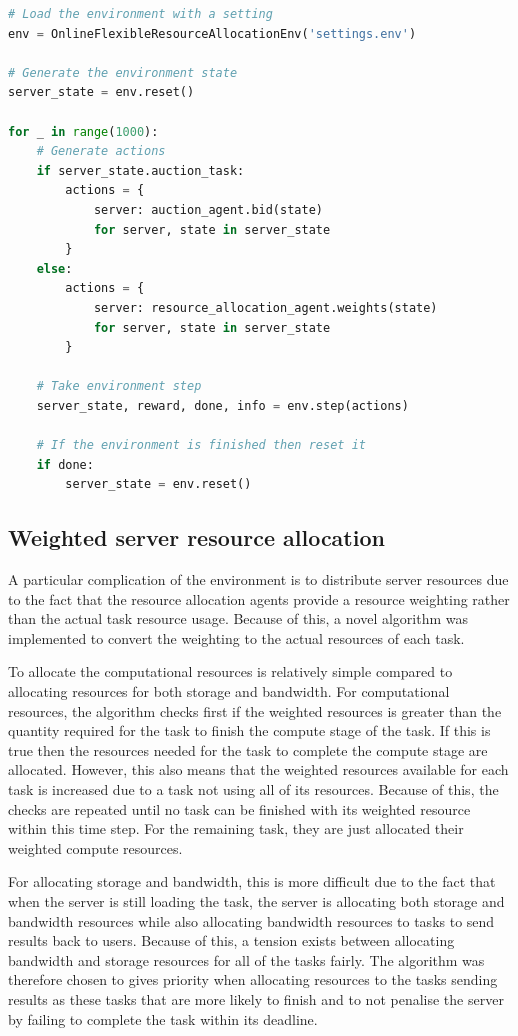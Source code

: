 \begin{lstlisting}[language=Python, frame=single, caption={Example code for running the environment}, captionpos=b, label={lst:example_flexible_resource_env}]
# Load the environment with a setting
env = OnlineFlexibleResourceAllocationEnv('settings.env')

# Generate the environment state
server_state = env.reset()

for _ in range(1000):
    # Generate actions
    if server_state.auction_task:
        actions = {
            server: auction_agent.bid(state)
            for server, state in server_state
        }
    else:
        actions = {
            server: resource_allocation_agent.weights(state)
            for server, state in server_state
        }

    # Take environment step
    server_state, reward, done, info = env.step(actions)

    # If the environment is finished then reset it
    if done:
        server_state = env.reset()
\end{lstlisting}

\subsection{Weighted server resource allocation}\label{subsec:weighted-server-resource-allocation}
A particular complication of the environment is to distribute server resources due to the fact that the resource
allocation agents provide a resource weighting rather than the actual task resource usage. Because of this, a novel
algorithm was implemented to convert the weighting to the actual resources of each task.

To allocate the computational resources is relatively simple compared to allocating resources for both storage and
bandwidth. For computational resources, the algorithm checks first if the weighted resources is greater than the
quantity required for the task to finish the compute stage of the task. If this is true then the resources needed for the
task to complete the compute stage are allocated. However, this also means that the weighted resources available for each
task is increased due to a task not using all of its resources. Because of this, the checks are repeated until no task
can be finished with its weighted resource within this time step. For the remaining task, they are just allocated their
weighted compute resources.

For allocating storage and bandwidth, this is more difficult due to the fact that when the server is still
loading the task, the server is allocating both storage and bandwidth resources while also allocating bandwidth
resources to tasks to send results back to users. Because of this, a tension exists between allocating bandwidth and
storage resources for all of the tasks fairly. The algorithm was therefore chosen to gives priority when allocating
resources to the tasks sending results as these tasks that are more likely to finish and to not penalise the
server by failing to complete the task within its deadline.

